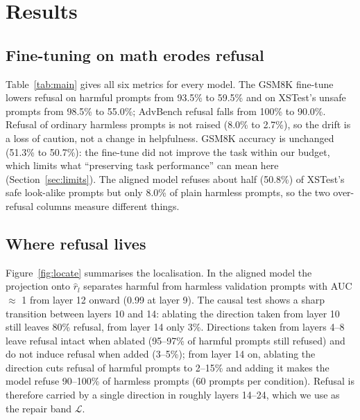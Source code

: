 \section{Results}
\subsection{Fine-tuning on math erodes refusal}
Table~\ref{tab:main} gives all six metrics for every model. The GSM8K fine-tune lowers refusal on harmful prompts from 93.5\% to 59.5\% and on XSTest's unsafe prompts from 98.5\% to 55.0\%; AdvBench refusal falls from 100\% to 90.0\%. Refusal of ordinary harmless prompts is not raised (8.0\% to 2.7\%), so the drift is a loss of caution, not a change in helpfulness. GSM8K accuracy is unchanged (51.3\% to 50.7\%): the fine-tune did not improve the task within our budget, which limits what ``preserving task performance'' can mean here (Section~\ref{sec:limits}). The aligned model refuses about half (50.8\%) of XSTest's safe look-alike prompts but only 8.0\% of plain harmless prompts, so the two over-refusal columns measure different things.

\begin{table}[t]
\centering
\caption{Refusal rates and GSM8K accuracy (\%), with 95\% Wilson intervals in brackets. Higher is better for the first three columns and GSM8K; lower is better for the XSTest-safe and Harmless columns. Sample sizes: 200, 100, 200, 250, 150, 150. ``(ours)'' marks methods that use the located refusal direction.}
\label{tab:main}
\footnotesize
\setlength{\tabcolsep}{4pt}

\end{table}

\subsection{Where refusal lives}
Figure~\ref{fig:locate} summarises the localisation. In the aligned model the projection onto $\hat r_l$ separates harmful from harmless validation prompts with AUC $\approx$ 1 from layer 12 onward (0.99 at layer 9). The causal test shows a sharp transition between layers 10 and 14: ablating the direction taken from layer 10 still leaves 80\% refusal, from layer 14 only 3\%. Directions taken from layers 4--8 leave refusal intact when ablated (95--97\% of harmful prompts still refused) and do not induce refusal when added (3--5\%); from layer 14 on, ablating the direction cuts refusal of harmful prompts to 2--15\% and adding it makes the model refuse 90--100\% of harmless prompts (60 prompts per condition). Refusal is therefore carried by a single direction in roughly layers 14--24, which we use as the repair band $\mathcal L$.

